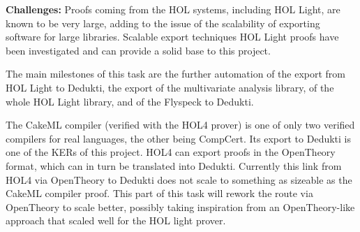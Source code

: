 \begin{workpackage}[id=libraries,type=RTD,wphases=1-48,
  short={Large libraries},%
  title={Large libraries},
  lead=Tum,
  StrRM=18,
  ChaRM=12,
  TumRM=27]
\begin{tasklist}
\begin{task}[
  id=flyspeck,
  title=The Flyspeck library,
  lead=Inr,
  wphases=1-36]
\textbf{Challenges:} Proofs coming from the HOL systems, including
       {HOL Light}, are known to be very large, adding to the issue of
       the scalability of exporting software for large
       libraries. Scalable export techniques HOL Light proofs have
       been investigated and can provide a solid base to this project.

The main milestones of this task are the further automation of the export from
{HOL Light} to {Dedukti}, the export of the multivariate analysis library, of
the whole {HOL Light} library, and of the {Flyspeck} to {Dedukti}.
\end{task}

\begin{task}[
  id=cakeml,
  title=The CakeML compiler library,
  lead=Cha,
  ChaRM=12,
  wphases=12-23]
%
The CakeML
compiler 
(verified with the HOL4 prover) is one of only two verified compilers for real
languages, the other being CompCert. Its export to Dedukti is one of
the KERs of this project.
%
HOL4 can export proofs in the OpenTheory format, which can in turn be
translated into Dedukti. Currently this link from HOL4 via OpenTheory
to Dedukti does not scale to something as sizeable as the CakeML
compiler proof. This part of this task will rework the route via
OpenTheory to scale better, possibly taking inspiration from an
OpenTheory-like approach that scaled well for the HOL light
prover.

\end{task}




\end{tasklist}
\end{workpackage}
